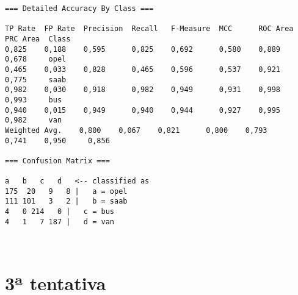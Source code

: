 \documentclass[
	article,			%
	11pt,				%
	oneside,			%
	a4paper,			%
	english,			%
	brazil,				%
	sumario=tradicional
	]{abntex2}
\begin{document}
\begin{lstlisting}
=== Detailed Accuracy By Class ===

TP Rate  FP Rate  Precision  Recall   F-Measure  MCC      ROC Area  PRC Area  Class
0,825    0,188    0,595      0,825    0,692      0,580    0,889     0,678     opel
0,465    0,033    0,828      0,465    0,596      0,537    0,921     0,775     saab
0,982    0,030    0,918      0,982    0,949      0,931    0,998     0,993     bus
0,940    0,015    0,949      0,940    0,944      0,927    0,995     0,982     van
Weighted Avg.    0,800    0,067    0,821      0,800    0,793      0,741    0,950     0,856     

=== Confusion Matrix ===

a   b   c   d   <-- classified as
175  20   9   8 |   a = opel
111 101   3   2 |   b = saab
4   0 214   0 |   c = bus
4   1   7 187 |   d = van
	
	
\end{lstlisting}

\section{3ª tentativa}
\end{document}
